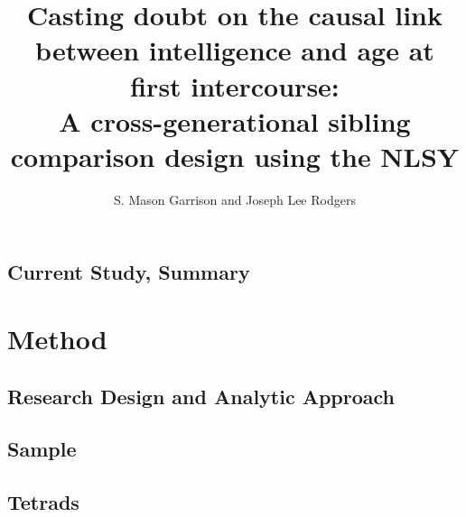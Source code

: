 \documentclass[a4paper,man,apacite,natbib,12pt,longtable,mask]{apa6}\usepackage[]{graphicx}\usepackage[]{color}
\title{Casting doubt on the causal link between intelligence and age at first intercourse:\\ A cross-generational sibling comparison design using the NLSY}
\author{S. Mason Garrison and Joseph Lee Rodgers}
\affiliation{Vanderbilt University}
\begin{document}
\maketitle

%











\section{ }\vspace{-.8cm}

\subsection{Current Study, Summary}


\section{Method}
\subsection{Research Design and Analytic Approach}

%
\subsection{Sample}

%
\subsection{Tetrads}

%
\end{document}
